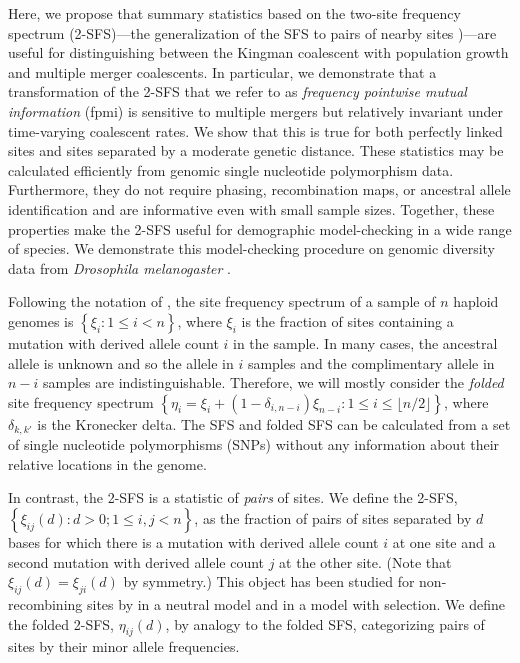 \documentclass[11pt, letterpaper]{article}   	%
\newcommand{\floor}[1]{\lfloor #1 \rfloor}
\begin{document}
Here, we propose that summary statistics based on the two-site frequency spectrum (2-SFS)---the generalization of the SFS to pairs of nearby sites \autocite{Hudson2001, FerrettiEtal2018})---are useful for distinguishing between the Kingman coalescent with population growth and multiple merger coalescents.
In particular, we demonstrate that a transformation of the 2-SFS that we refer to as \emph{frequency pointwise mutual information} (fpmi) is sensitive to multiple mergers but relatively invariant under time-varying coalescent rates.
We show that this is true for both perfectly linked sites and sites separated by a moderate genetic distance.
These statistics may be calculated efficiently from genomic single nucleotide polymorphism data.
Furthermore, they do not require phasing, recombination maps, or ancestral allele identification and are informative even with small sample sizes.
Together, these properties make the 2-SFS useful for demographic model-checking in a wide range of species.
We demonstrate this model-checking procedure on genomic diversity data from \textit{Drosophila melanogaster} \autocite{LackEtAl2015}.

Following the notation of \cite{Fu1995}, the site frequency spectrum of a sample of $n$ haploid genomes is $\left\{ \xi_i : 1 \leq i < n \right\}$, where $\xi_i$ is the fraction of sites containing a mutation with derived allele count $i$ in the sample.
In many cases, the ancestral allele is unknown and so the allele in $i$ samples and the complimentary allele in $n-i$ samples are indistinguishable.
Therefore, we will mostly consider the \textit{folded} site frequency spectrum $\left\{ \eta_i = \xi_i + (1-\delta_{i,n-i}) \xi_{n-i}: 1 \leq i \leq \floor{n/2} \right\}$, where $\delta_{k,k'}$ is the Kronecker delta. %
The SFS and folded SFS can be calculated from a set of single nucleotide polymorphisms (SNPs) without any information about their relative locations in the genome.

In contrast, the 2-SFS is a statistic of \textit{pairs} of sites.
We define the 2-SFS,
$\left\{ \xi_{ij}(d) : d > 0; 1 \leq i, j < n\right\}$,
as the fraction of pairs of sites separated by $d$ bases for which there is a mutation with derived allele count $i$ at one site and a second mutation with derived allele count $j$ at the other site.
(Note that $\xi_{ij}(d) = \xi_{ji}(d)$ by symmetry.)
This object has been studied for non-recombining sites by \cite{FerrettiEtAl2018} in a neutral model and \cite{Xie2011} in a model with selection.
We define the folded 2-SFS, $\eta_{ij}(d)$, by analogy to the folded SFS,  categorizing pairs of sites by their minor allele frequencies.
\end{document}
